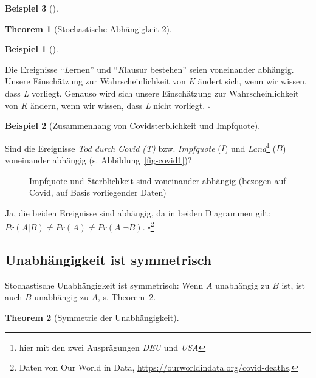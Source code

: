 \documentclass[
  ngerman,
  letterpaper,
  twoside,
  open=any]{scrbook}
\theoremstyle{definition}
\newtheorem{example}{Beispiel}[chapter]
\theoremstyle{plain}
\newtheorem{theorem}{Theorem}[chapter]
\theoremstyle{definition}
\theoremstyle{definition}
\theoremstyle{remark}
\begin{document}
\begin{example}[]
\begin{theorem}[Stochastische Abhängigkeit
2]
\end{theorem}

\begin{example}[]\protect\hypertarget{exm-abh-lernen}{}\label{exm-abh-lernen}

Die Ereignisse \enquote{\emph{L}ernen} und \enquote{\emph{K}lausur
bestehen} seien voneinander abhängig. Unsere Einschätzung zur
Wahrscheinlichkeit von \emph{K} ändert sich, wenn wir wissen, dass
\emph{L} vorliegt. Genauso wird sich unsere Einschätzung zur
Wahrscheinlichkeit von \emph{K} ändern, wenn wir wissen, dass \emph{L}
nicht vorliegt. \(\square\)

\end{example}

\begin{example}[Zusammenhang von Covidsterblichkeit und
Impfquote]\protect\hypertarget{exm-covid}{}\label{exm-covid}

Sind die Ereignisse \emph{Tod durch Covid (T)} bzw. \emph{Impfquote}
(\(I\)) und \emph{Land}\footnote{hier mit den zwei Ausprägungen
  \emph{DEU} und \emph{USA}} (\(B\)) voneinander abhängig (s.
Abbildung~\ref{fig-covid1})?

\begin{figure}[H]

\begin{minipage}[t]{0.50\linewidth}
Impfquote und Sterblichkeit sind voneinander abhängig (bezogen auf
Covid, auf Basis vorliegender Daten)\end{minipage}%

\end{figure}%

Ja, die beiden Ereignisse sind abhängig, da in beiden Diagrammen gilt:
\(Pr(A|B) \ne Pr(A) \ne Pr(A|\neg B)\). \(\square\)\footnote{ Daten von
  Our World in Data, \url{https://ourworldindata.org/covid-deaths}.}

\end{example}

\subsection{Unabhängigkeit ist
symmetrisch}\label{unabhuxe4ngigkeit-ist-symmetrisch}

Stochastische Unabhängigkeit ist symmetrisch: Wenn \(A\) unabhängig zu
\(B\) ist, ist auch \(B\) unabhängig zu \(A\), s.
Theorem~\ref{thm-indep-symm}.

\begin{theorem}[Symmetrie der
Unabhängigkeit]\protect\hypertarget{thm-indep-symm}{}\label{thm-indep-symm}


\end{theorem}
\end{example}
\end{document}
